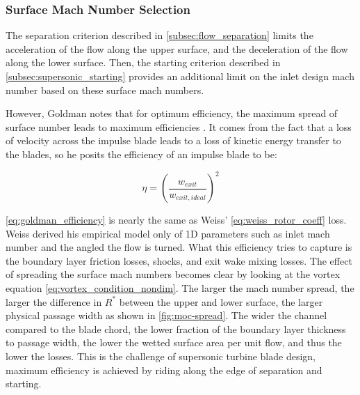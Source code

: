 
\subsubsection{Surface Mach Number Selection}

The separation criterion described in \cref{subsec:flow_separation} limits the acceleration of the flow along the upper surface, and the deceleration of the flow along the lower surface. Then, the starting criterion described in \cref{subsec:supersonic_starting} provides an additional limit on the inlet design mach number based on these surface mach numbers. 

However, Goldman notes that for optimum efficiency, the maximum spread of surface number leads to maximum efficiencies \cite{goldmanAnalyticalInvestigationBlade1970}. It comes from the fact that a loss of velocity across the impulse blade leads to a loss of kinetic energy transfer to the blades, so he posits the efficiency of an impulse blade to be:

\begin{equation}
    \eta = \left(\frac{w_{exit}}{w_{exit,ideal}}\right)^2
    \label{eq:goldman_efficiency}
\end{equation}

\cref{eq:goldman_efficiency} is nearly the same as Weiss' \cref{eq:weiss_rotor_coeff} loss. Weiss derived his empirical model only of 1D parameters such as inlet mach number and the angled the flow is turned. What this efficiency tries to capture is the boundary layer friction losses, shocks, and exit wake mixing losses. The effect of spreading the surface mach numbers becomes clear by looking at the vortex equation \cref{eq:vortex_condition_nondim}. The larger the mach number spread, the larger the difference in $R^*$ between the upper and lower surface, the larger physical passage width as shown in \cref{fig:moc-spread}. The wider the channel compared to the blade chord, the lower fraction of the boundary layer thickness to passage width, the lower the wetted surface area per unit flow, and thus the lower the losses. This is the challenge of supersonic turbine blade design, maximum efficiency is achieved by riding along the edge of separation and starting.


